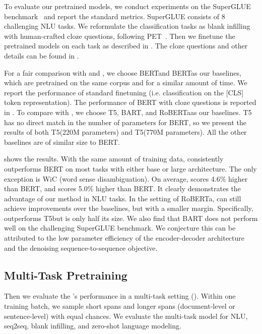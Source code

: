 To evaluate our pretrained \model models, we conduct experiments on the SuperGLUE benchmark~\cite{SuperGLUE2019} and report the standard metrics. SuperGLUE consists of 8 challenging NLU tasks.
We reformulate the classification tasks as blank infilling with human-crafted cloze questions, following PET~\cite{PET2:2009-07118}. Then we finetune the pretrained \model models on each task as described in . The cloze questions and other details can be found in .


For a fair comparison with \modelx\base and \modelx\largem, we choose BERT\base and BERT\largem as our baselines, which are pretrained on the same corpus and for a similar amount of time. We report the performance of standard finetuning (i.e. classification on the [CLS] token representation). The performance of BERT with cloze questions is reported in . To compare with \modelx\roberta, we choose T5, BART\largem, and RoBERTa\largem as our baselines. T5 has no direct match in the number of parameters for BERT\largem, so we present the results of both T5\base (220M parameters) and T5\largem (770M parameters). All the other baselines are of similar size to BERT\largem.

 shows the results. With the same amount of training data, \model consistently outperforms BERT on most tasks with either base or large architecture. The only exception is WiC (word sense disambiguation). On average, \modelx\base scores 4.6\% higher than BERT\base, and \modelx\largem scores 5.0\% higher than BERT\largem. It clearly demonstrates the advantage of our method in NLU tasks. In the setting of RoBERTa\largem, \modelx\roberta can still achieve improvements over the baselines, but with a smaller margin. Specifically, \modelx\roberta outperforms T5\largem but is only half its size. We also find that BART does not perform well on the challenging SuperGLUE benchmark. We conjecture this can be attributed to the low parameter efficiency of the encoder-decoder architecture and the denoising sequence-to-sequence objective. 

\subsection{Multi-Task Pretraining}
\label{subsec:multi_obj}
Then we evaluate the \model's performance in a multi-task setting (). Within one training batch, we sample short spans and longer spans (document-level or sentence-level) with equal chances. We evaluate the multi-task model for NLU, seq2seq, blank infilling, and zero-shot language modeling.

